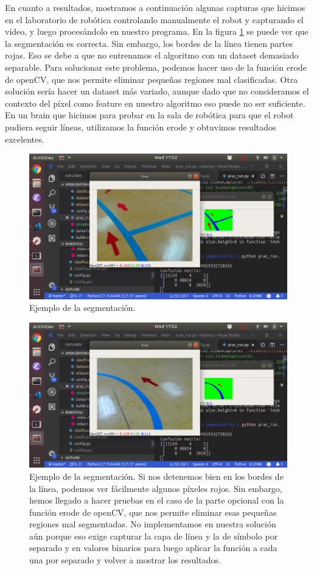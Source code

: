\documentclass{article}
\begin{document}
	En cuanto a resultados, mostramos a continuación algunas capturas que hicimos en el laboratorio de robótica controlando manualmente el robot y capturando el vídeo, y luego procesándolo en nuestro programa. En la figura \ref{fig:figura1} se puede ver que la segmentación es correcta. Sin embargo, los bordes de la línea tienen partes rojas. Eso se debe a que no entrenamos el algoritmo con un dataset demasiado separable. Para solucionar este problema, podemos hacer uso de la función erode de openCV, que nos permite eliminar pequeñas regiones mal clasificadas. Otra solución sería hacer un dataset más variado, aunque dado que no consideramos el contexto del píxel como feature en nuestro algoritmo eso puede no ser suficiente. En un brain que hicimos para probar en la sala de robótica para que el robot pudiera seguir líneas, utilizamos la función erode y obtuvimos resultados excelentes.

	\begin{figure}[H]
	    \centering
	    \includegraphics[width=12cm]{./figures/figura1.png}
	    \caption{Ejemplo de la segmentación.} 
	    \label{fig:figura1}
	\end{figure}

	\begin{figure}[H]
	    \centering
	    \includegraphics[width=12cm]{./figures/figura2.png}
	    \caption{Ejemplo de la segmentación. Si nos detenemos bien en los bordes de la línea, podemos ver fácilmente algunos píxeles rojos. Sin embargo, hemos llegado a hacer pruebas en el caso de la parte opcional con la función erode de openCV, que nos permite eliminar esas pequeñas regiones mal segmentadas. No implementamos en nuestra solución aún porque eso exige capturar la capa de línea y la de símbolo por separado y en valores binarios para luego aplicar la función a cada una por separado y volver a mostrar los resultados.}
	    \label{fig:figura2}
	\end{figure}
\end{document}

